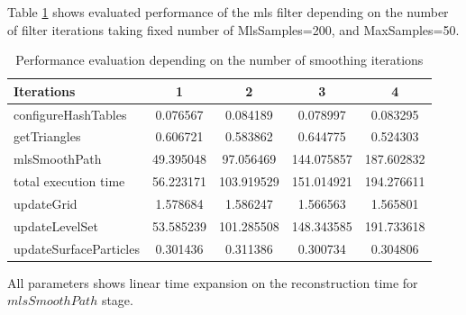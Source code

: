 Table \ref{tab:mls_iter_perf} shows evaluated performance of the mls filter depending on the number of filter iterations taking fixed number of MlsSamples=200, and MaxSamples=50.
\begin{table}[H]
	\begin{center}
		\scriptsize
		\begin{tabular}{|l|c|c|c|c|}
			\hline
			Iterations & 1 & 2 & 3 & 4 \\
			\hline
			configureHashTables     	& 0.076567	&	0.084189	& 0.078997		& 0.083295\\
			getTriangles    			& 0.606721	&	0.583862	& 0.644775		& 0.524303\\
			mlsSmoothPath   			& 49.395048	&	97.056469	& 144.075857	& 187.602832\\
			total execution time    	& 56.223171	&	103.919529	& 151.014921	& 194.276611\\
			updateGrid      			& 1.578684	&	1.586247	& 1.566563		& 1.565801\\
			updateLevelSet  			& 53.585239	&	101.285508	& 148.343585	& 191.733618\\
			updateSurfaceParticles  	& 0.301436	&	0.311386	& 0.300734		& 0.304806\\
			\hline
		\end{tabular}
	\end{center}
	\caption{Performance evaluation depending on the number of smoothing iterations}
	\label{tab:mls_iter_perf}
\end{table}
All parameters shows linear time expansion on the reconstruction time for $mlsSmoothPath$ stage.

